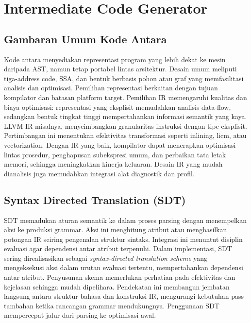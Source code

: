 \documentclass[../main.tex]{subfiles}
\begin{document}
\chapter{Intermediate Code Generator}
\label{ch:intermediate-code}

\section{Gambaran Umum Kode Antara}
Kode antara menyediakan representasi program yang lebih dekat ke mesin daripada AST, namun tetap portabel lintas arsitektur. Desain umum meliputi tiga-address code, SSA, dan bentuk berbasis pohon atau graf yang memfasilitasi analisis dan optimisasi.\cite{muchnick, llvm-langref} Pemilihan representasi berkaitan dengan tujuan kompilator dan batasan platform target.
Pemilihan IR memengaruhi kualitas dan biaya optimisasi: representasi yang eksplisit memudahkan analisis data-flow, sedangkan bentuk tingkat tinggi mempertahankan informasi semantik yang kaya. LLVM IR misalnya, menyeimbangkan granularitas instruksi dengan tipe eksplisit.\cite{llvm-langref} Pertimbangan ini menentukan efektivitas transformasi seperti inlining, licm, atau vectorization.
Dengan IR yang baik, kompilator dapat menerapkan optimisasi lintas prosedur, penghapusan subekspresi umum, dan perbaikan tata letak memori, sehingga meningkatkan kinerja keluaran. Desain IR yang mudah dianalisis juga memudahkan integrasi alat diagnostik dan profil.

\section{Syntax Directed Translation (SDT)}
SDT memadukan aturan semantik ke dalam proses parsing dengan menempelkan aksi ke produksi grammar. Aksi ini menghitung atribut atau menghasilkan potongan IR seiring pengenalan struktur sintaks.\cite{aho-dragon-book-2006} Integrasi ini menuntut disiplin evaluasi agar dependensi antar atribut terpenuhi.
Dalam implementasi, SDT sering direalisasikan sebagai \textit{syntax-directed translation scheme} yang mengeksekusi aksi dalam urutan evaluasi tertentu, mempertahankan dependensi antar atribut.\cite{grune-parsing} Penyusunan skema memerlukan perhatian pada efektivitas dan kejelasan sehingga mudah dipelihara.
Pendekatan ini membangun jembatan langsung antara struktur bahasa dan konstruksi IR, mengurangi kebutuhan pass tambahan ketika rancangan grammar mendukungnya. Penggunaan SDT mempercepat jalur dari parsing ke optimisasi awal.
\end{document}
